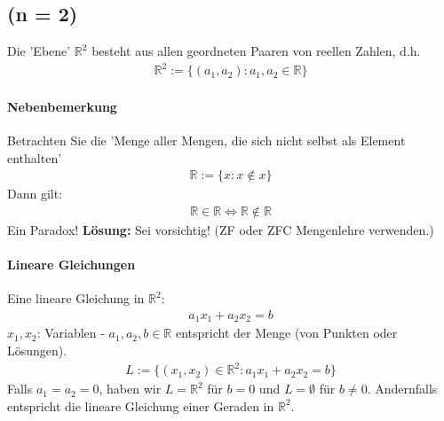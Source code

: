 \documentclass[11pt]{report}
\newcommand*\Zb[1] {\mathbb{#1}}
\begin{document}
\subsection{(n = 2)}
Die 'Ebene' $\Zb{R}^{2}$ besteht aus allen geordneten Paaren von reellen Zahlen, d.h.
\begin{align}
\Zb{R}^{2} := \{(a_1,a_2):a_1, a_2 \in \Zb{R}\}
\end{align}
    
\paragraph{Nebenbemerkung}
Betrachten Sie die 'Menge aller Mengen, die sich nicht selbst als Element enthalten'
\begin{align}
\Zb{R} := \{x:x \notin x\}
\end{align}
Dann gilt:
\begin{align}
\Zb{R} \in \Zb{R} \Leftrightarrow \Zb{R} \notin \Zb{R}
\end{align}
Ein Paradox!
\textbf{Lösung:} Sei vorsichtig! (ZF oder ZFC Mengenlehre verwenden.)

\paragraph{Lineare Gleichungen}
Eine lineare Gleichung in $\Zb{R}^{2}$:
\begin{align}
a_1 x_1 + a_2 x_2 = b
\end{align}
$x_1, x_2$: Variablen - $a_1, a_2, b \in \Zb{R}$
entspricht der Menge (von Punkten oder Lösungen).
\begin{align}
L := \{(x_1,x_2) \in \Zb{R}^{2}: a_1 x_1 + a_2 x_2 = b\}
\end{align} 
Falls $a_1 = a_2 = 0$, haben wir $L = \Zb{R}^{2}$ für $b=0$ und $L=\emptyset$ für $b \neq 0$.
Andernfalls entspricht die lineare Gleichung einer Geraden in $\Zb{R}^{2}$.
    
\end{document}
